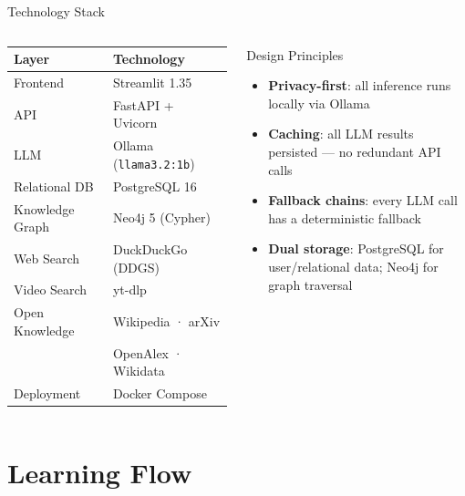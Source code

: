 \documentclass[aspectratio=169,12pt]{beamer}
\begin{document}
\begin{frame}{Technology Stack}
  \begin{columns}
      \begin{table}
        \centering\small
        \begin{tabular}{ll}
          \toprule
          \textbf{Layer} & \textbf{Technology} \\
          \midrule
          Frontend     & Streamlit 1.35 \\
          API          & FastAPI + Uvicorn \\
          LLM          & Ollama (\texttt{llama3.2:1b}) \\
          Relational DB & PostgreSQL 16 \\
          Knowledge Graph & Neo4j 5 (Cypher) \\
          Web Search   & DuckDuckGo (DDGS) \\
          Video Search & yt-dlp \\
          Open Knowledge & Wikipedia · arXiv \\
                       & OpenAlex · Wikidata \\
          Deployment   & Docker Compose \\
          \bottomrule
        \end{tabular}
      \end{table}
      \begin{block}{Design Principles}
        \begin{itemize}
          \item \textbf{Privacy-first}: all inference runs locally via Ollama
          \item \textbf{Caching}: all LLM results persisted — no redundant API calls
          \item \textbf{Fallback chains}: every LLM call has a deterministic fallback
          \item \textbf{Dual storage}: PostgreSQL for user/relational data; Neo4j for graph traversal
        \end{itemize}
      \end{block}
  \end{columns}
\end{frame}

\section{Learning Flow}
\end{document}
